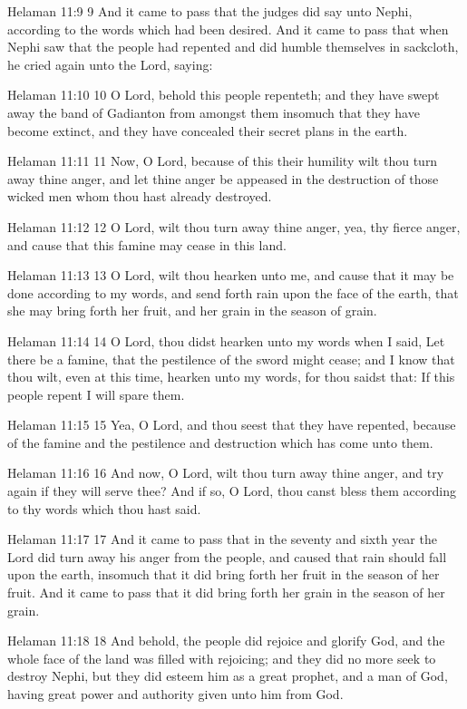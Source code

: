 Helaman 11:9
 9 And it came to pass that the judges did say unto Nephi,
according to the words which had been desired. And it came to
pass that when Nephi saw that the people had repented and did
humble themselves in sackcloth, he cried again unto the Lord,
saying:

Helaman 11:10
 10 O Lord, behold this people repenteth; and they have swept
away the band of Gadianton from amongst them insomuch that they
have become extinct, and they have concealed their secret plans
in the earth.

Helaman 11:11
 11 Now, O Lord, because of this their humility wilt thou turn
away thine anger, and let thine anger be appeased in the
destruction of those wicked men whom thou hast already destroyed.

Helaman 11:12
 12 O Lord, wilt thou turn away thine anger, yea, thy fierce
anger, and cause that this famine may cease in this land.

Helaman 11:13
 13 O Lord, wilt thou hearken unto me, and cause that it may be
done according to my words, and send forth rain upon the face of
the earth, that she may bring forth her fruit, and her grain in
the season of grain.

Helaman 11:14
 14 O Lord, thou didst hearken unto my words when I said, Let
there be a famine, that the pestilence of the sword might cease;
and I know that thou wilt, even at this time, hearken unto my
words, for thou saidst that: If this people repent I will spare
them.

Helaman 11:15
 15 Yea, O Lord, and thou seest that they have repented, because
of the famine and the pestilence and destruction which has come
unto them.

Helaman 11:16
 16 And now, O Lord, wilt thou turn away thine anger, and try
again if they will serve thee? And if so, O Lord, thou canst
bless them according to thy words which thou hast said.

Helaman 11:17
 17 And it came to pass that in the seventy and sixth year the
Lord did turn away his anger from the people, and caused that
rain should fall upon the earth, insomuch that it did bring forth
her fruit in the season of her fruit. And it came to pass that
it did bring forth her grain in the season of her grain.

Helaman 11:18
 18 And behold, the people did rejoice and glorify God, and the
whole face of the land was filled with rejoicing; and they did no
more seek to destroy Nephi, but they did esteem him as a great
prophet, and a man of God, having great power and authority given
unto him from God.

